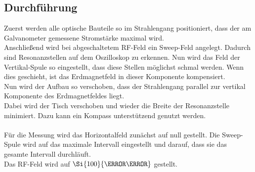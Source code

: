 \subsection{Durchführung}

Zuerst werden alle optische Bauteile so im Strahlengang positioniert, dass der am Galvanometer gemessene Stromstärke maximal wird.\\
Anschließend wird bei abgeschaltetem RF-Feld ein Sweep-Feld angelegt. Dadurch sind Resonanzstellen auf dem Oszilloskop zu erkennen.
Nun wird das Feld der Vertikal-Spule so eingestellt, dass diese Stellen möglichst schmal werden. Wenn dies geschieht, ist das Erdmagnetfeld in dieser Komponente kompensiert.\\
Nun wird der Aufbau so verschoben, dass der Strahlengang parallel zur vertikal Komponente des Erdmagnetfeldes liegt. \\
Dabei wird der Tisch verschoben und wieder die Breite der Resonanzstelle minimiert. Dazu kann ein Kompass unterstützend genutzt werden.\\\\
Für die Messung wird das Horizontalfeld zunächst auf null gestellt.
Die Sweep-Spule wird auf das maximale Intervall eingestellt und darauf, dass sie das gesamte Intervall durchläuft.\\
Das RF-Feld wird auf $\Si{100}{\kilo\hertz}$ gestellt.
